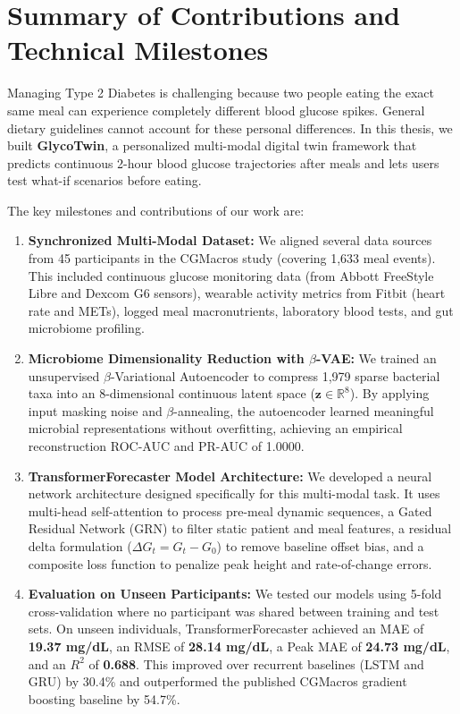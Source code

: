 \label{chap:conclusion}

\section{Summary of Contributions and Technical Milestones}
Managing Type 2 Diabetes is challenging because two people eating the exact same meal can experience completely different blood glucose spikes. General dietary guidelines cannot account for these personal differences. In this thesis, we built \textbf{GlycoTwin}, a personalized multi-modal digital twin framework that predicts continuous 2-hour blood glucose trajectories after meals and lets users test what-if scenarios before eating.

The key milestones and contributions of our work are:
\begin{enumerate}
    \item \textbf{Synchronized Multi-Modal Dataset:} We aligned several data sources from 45 participants in the CGMacros study (covering 1,633 meal events). This included continuous glucose monitoring data (from Abbott FreeStyle Libre and Dexcom G6 sensors), wearable activity metrics from Fitbit (heart rate and METs), logged meal macronutrients, laboratory blood tests, and gut microbiome profiling.
    \item \textbf{Microbiome Dimensionality Reduction with $\beta$-VAE:} We trained an unsupervised $\beta$-Variational Autoencoder to compress 1,979 sparse bacterial taxa into an 8-dimensional continuous latent space ($\mathbf{z} \in \mathbb{R}^{8}$). By applying input masking noise and $\beta$-annealing, the autoencoder learned meaningful microbial representations without overfitting, achieving an empirical reconstruction ROC-AUC and PR-AUC of 1.0000.
    \item \textbf{TransformerForecaster Model Architecture:} We developed a neural network architecture designed specifically for this multi-modal task. It uses multi-head self-attention to process pre-meal dynamic sequences, a Gated Residual Network (GRN) to filter static patient and meal features, a residual delta formulation ($\Delta G_t = G_t - G_0$) to remove baseline offset bias, and a composite loss function to penalize peak height and rate-of-change errors.
    \item \textbf{Evaluation on Unseen Participants:} We tested our models using 5-fold cross-validation where no participant was shared between training and test sets. On unseen individuals, TransformerForecaster achieved an MAE of \textbf{19.37 mg/dL}, an RMSE of \textbf{28.14 mg/dL}, a Peak MAE of \textbf{24.73 mg/dL}, and an $R^2$ of \textbf{0.688}. This improved over recurrent baselines (LSTM and GRU) by 30.4\% and outperformed the published CGMacros gradient boosting baseline by 54.7\%.

\end{enumerate}
